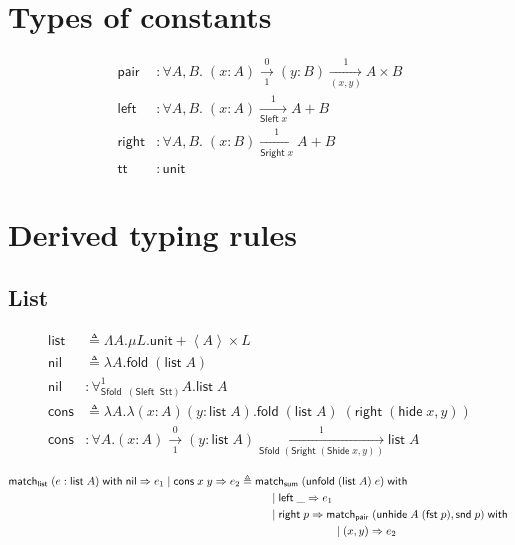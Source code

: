 \documentclass{article}
\newcommand{\thide}[1]{\left \langle #1 \right \rangle}
\newcommand{\arrow}[4]{#1\xrightarrow[#3]{#2}#4}
\newcommand{\symmatch}{\mathsf{match}}
\newcommand{\symwith}{\mathsf{\;with\;}}
\newcommand{\symleft}{\mathsf{left}}
\newcommand{\symright}{\mathsf{right}}
\newcommand{\symSleft}{\mathsf{Sleft\;}}
\newcommand{\symSright}{\mathsf{Sright\;}}
\newcommand{\symfold}{\mathsf{fold\;}}
\newcommand{\symSfold}{\mathsf{Sfold\;}}
\newcommand{\symunfold}{\mathsf{unfold\;}}
\newcommand{\symhide}{\mathsf{hide\;}}
\newcommand{\symShide}{\mathsf{Shide\;}}
\newcommand{\symunhide}{\mathsf{unhide\;}}
\newcommand{\sympair}{\mathsf{pair}}
\newcommand{\symtt}{\mathsf{tt}}
\newcommand{\symunit}{\mathsf{unit}}
\newcommand{\symlist}{\mathsf{list}}
\newcommand{\symnil}{\mathsf{nil}}
\newcommand{\symcons}{\mathsf{cons}}
\newcommand{\intro}[2]{(#1 : #2)}
\newcommand{\symsum}{\mathsf{sum}}
\newcommand{\symfst}{\mathsf{fst}}
\newcommand{\symsnd}{\mathsf{snd}}
\newcommand{\symStt}{\mathsf{Stt}}
\newcommand{\defeq}{\triangleq}
\begin{document}
\section{Types of constants}

\begin{align*}
\sympair&:\forall A,B.\;\arrow{\intro{x}{A}}{0}{1}{\arrow{\intro{y}{B}}{1}{(x,y)}{A\times B}} \\
\symleft&:\forall A,B.\;\arrow{\intro{x}{A}}{1}{\symSleft x}{A+B} \\
\symright&:\forall A,B.\;\arrow{\intro{x}{B}}{1}{\symSright x}{A+B} \\
\symtt&:\symunit
\end{align*}

\section{Derived typing rules}

\subsection{List}

\begin{align*}
\symlist &\defeq \Lambda A. \mu L. \symunit + \thide{A} \times L \\
\symnil &\defeq \lambda A. \symfold (\symlist\;A) \\
\symnil &: \forall^{1}_{\symSfold\;(\symSleft\;\symStt)} A. \symlist\;A \\
\symcons &\defeq \lambda A. \lambda(x : A)(y : \symlist\;A). \symfold (\symlist\;A)\;(\symright\;(\symhide x,y)) \\
\symcons &: \forall A. \arrow{\intro{x}{A}}{0}{1}{\arrow{\intro{y}{\symlist\;A}}{1}{\symSfold (\symSright (\symShide x, y))}{\symlist\;A}} 
\end{align*}

\begin{align*}
\symmatch_\symlist\; (e : \symlist\;A) \symwith \symnil \Rightarrow e_1 \;|\; \symcons\;x\;y \Rightarrow e_2 
  & \defeq \symmatch_\symsum\;(\symunfold (\symlist\;A)\;e) \symwith \\
  & \hspace{0.4in} |\;\symleft\;\_ \Rightarrow e_1 \\
  & \hspace{0.4in} |\; \symright\;p \Rightarrow \symmatch_\sympair\;(\symunhide A\;(\symfst\;p),\symsnd\;p)\symwith \\
  & \hspace{1.2in} |\; (x,y) \Rightarrow e_2
\end{align*}
\end{document}
